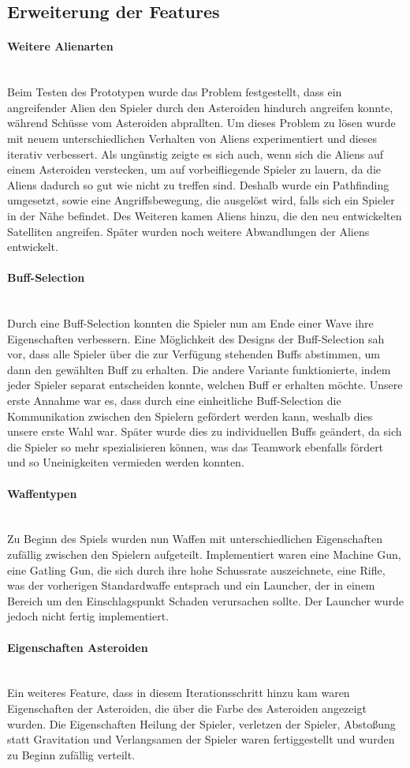 \documentclass[11pt]{scrartcl}
\newcommand{\lbparagraph}[1]{\paragraph*{#1}\mbox{}\\}
\begin{document}
\subsection{Erweiterung der Features}
\lbparagraph{Weitere Alienarten}
Beim Testen des Prototypen wurde das Problem festgestellt, dass ein angreifender Alien den Spieler durch den Asteroiden hindurch angreifen konnte, während Schüsse vom Asteroiden abprallten. Um dieses Problem zu lösen wurde mit neuem unterschiedlichen Verhalten von Aliens experimentiert und dieses iterativ verbessert.
Als ungünstig zeigte es sich auch, wenn sich die Aliens auf einem Asteroiden verstecken, um auf vorbeifliegende Spieler zu lauern, da die Aliens dadurch so gut wie nicht zu treffen sind. Deshalb wurde ein Pathfinding umgesetzt, sowie eine Angriffsbewegung, die ausgelöst wird, falls sich ein Spieler in der Nähe befindet. Des Weiteren kamen Aliens hinzu, die den neu entwickelten Satelliten angreifen. Später wurden noch weitere Abwandlungen der Aliens entwickelt.

\lbparagraph{Buff-Selection}
Durch eine Buff-Selection konnten die Spieler nun am Ende einer Wave ihre Eigenschaften verbessern. Eine Möglichkeit des Designs der Buff-Selection sah vor, dass alle Spieler über die zur Verfügung stehenden Buffs abstimmen, um dann den gewählten Buff zu erhalten. Die andere Variante funktionierte, indem jeder Spieler separat entscheiden konnte, welchen Buff er erhalten möchte. Unsere erste Annahme war es, dass durch eine einheitliche Buff-Selection die Kommunikation zwischen den Spielern gefördert werden kann, weshalb dies unsere erste Wahl war.
Später wurde dies zu individuellen Buffs geändert, da sich die Spieler so mehr spezialisieren können, was das Teamwork ebenfalls fördert und so Uneinigkeiten vermieden werden konnten.

\lbparagraph{Waffentypen}
Zu Beginn des Spiels wurden nun Waffen mit unterschiedlichen Eigenschaften zufällig zwischen den Spielern aufgeteilt. Implementiert waren eine Machine Gun, eine Gatling Gun, die sich durch ihre hohe Schussrate auszeichnete, eine Rifle, was der vorherigen Standardwaffe entsprach und ein Launcher, der in einem Bereich um den Einschlagspunkt Schaden verursachen sollte. Der Launcher wurde jedoch nicht fertig implementiert.

\lbparagraph{Eigenschaften Asteroiden}
Ein weiteres Feature, dass in diesem Iterationsschritt hinzu kam waren Eigenschaften der Asteroiden, die über die Farbe des Asteroiden angezeigt wurden. Die Eigenschaften Heilung der Spieler, verletzen der Spieler, Abstoßung statt Gravitation und Verlangsamen der Spieler waren fertiggestellt und wurden zu Beginn zufällig verteilt.
\end{document}

